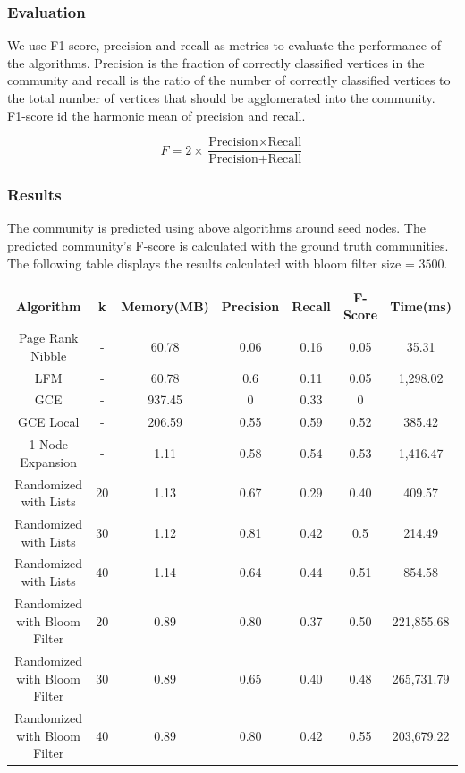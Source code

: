 \documentclass[a4paper]{article}
\begin{document}
\subsubsection{Evaluation}
We use F1-score, precision and recall as metrics to evaluate the performance of the algorithms. Precision is the fraction of correctly classified vertices in the community and recall is the ratio of the number of correctly classified vertices to the total number of vertices that should be agglomerated into the community.
F1-score id the harmonic mean of precision and recall.

\[
F= 2 \times \frac{\text{Precision} \times \text{Recall}}{\text{Precision} + \text{Recall}}
\]


\subsubsection{Results}

The community is predicted using above algorithms around seed nodes. The predicted community's F-score is calculated with the ground truth communities. The following table displays the results calculated with bloom filter size = $3500$.
 

\begin{center}
 \begin{tabular}{||c c c c c c c||} 
 \hline
 Algorithm & k & Memory(MB) & Precision & Recall & F-Score & Time(ms)\\ [0.4ex] 
 \hline\hline
 
 Page Rank Nibble & - & 60.78 & 0.06 & 0.16 & 0.05  & 35.31\\ 
 \hline
 LFM & - & 60.78 & 0.6 & 0.11 & 0.05 & 1,298.02\\ 
 \hline
 GCE & - & 937.45 & 0 & 0.33 & 0 & \\ 
 \hline
 GCE Local & - & 206.59 & 0.55 & 0.59 & 0.52 & 385.42\\ 
 \hline
 1 Node Expansion & - & 1.11 &0.58 & 0.54 & 0.53 & 1,416.47\\
 \hline
 Randomized with Lists & 20 & 1.13 & 0.67 & 0.29 & 0.40  & 409.57\\
 \hline
 Randomized with Lists & 30 & 1.12 & 0.81 & 0.42 & 0.5 & 214.49 \\
 \hline
 Randomized with Lists & 40 & 1.14 & 0.64 & 0.44 & 0.51  & 854.58 \\  
 \hline
 Randomized with Bloom Filter & 20 & 0.89 & 0.80 & 0.37 & 0.50 & 221,855.68\\  
 \hline
 Randomized with Bloom Filter & 30 & 0.89 & 0.65 & 0.40 & 0.48  & 265,731.79\\  
 \hline
 Randomized with Bloom Filter & 40 & 0.89 & 0.80 & 0.42 & 0.55  & 203,679.22\\  
 \hline
\end{tabular}
\end{center}
\end{document}
